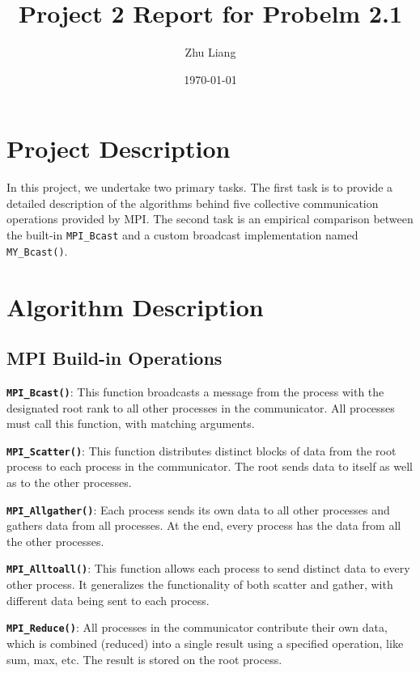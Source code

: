 \documentclass[12pt,a4paper]{article}
\title{Project 2 Report for Probelm 2.1}
\author{Zhu Liang}
\date{\today}
\begin{document}
\maketitle

\section{Project Description}
In this project, we undertake two primary tasks. 
The first task is to provide a detailed description of the algorithms behind five collective communication operations provided by MPI.
The second task is an empirical comparison between the built-in \texttt{MPI\_Bcast} and a custom broadcast implementation named \texttt{MY\_Bcast()}.

\section{Algorithm Description}
\subsection{MPI Build-in Operations}


\textbf{\texttt{MPI\_Bcast()}}: This function broadcasts a message from the process with the designated root rank to all other processes in the communicator. All processes must call this function, with matching arguments.

\textbf{\texttt{MPI\_Scatter()}}: This function distributes distinct blocks of data from the root process to each process in the communicator. The root sends data to itself as well as to the other processes.

\textbf{\texttt{MPI\_Allgather()}}: Each process sends its own data to all other processes and gathers data from all processes. At the end, every process has the data from all the other processes.

\textbf{\texttt{MPI\_Alltoall()}}: This function allows each process to send distinct data to every other process. It generalizes the functionality of both scatter and gather, with different data being sent to each process.

\textbf{\texttt{MPI\_Reduce()}}: All processes in the communicator contribute their own data, which is combined (reduced) into a single result using a specified operation, like sum, max, etc. The result is stored on the root process.
\end{document}
